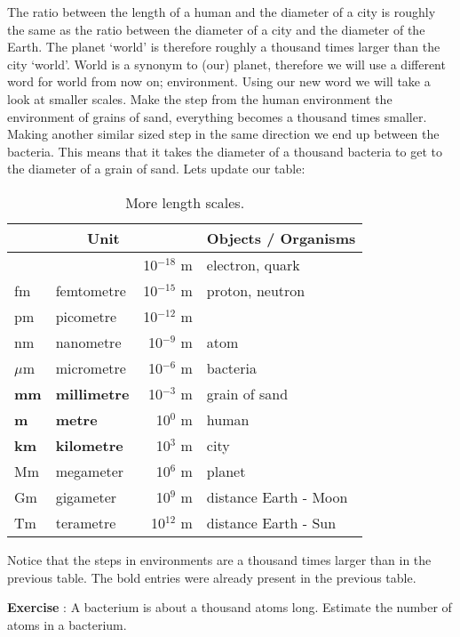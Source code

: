 The ratio between the length of a human and the diameter of a city is roughly the same as the ratio between the diameter of a city and the diameter of the Earth. The planet `world' is therefore roughly a thousand times larger than the city `world'. World is a synonym to (our) planet, therefore we will use a different word for world from now on; environment. Using our new word we will take a look at smaller scales. Make the step from the human environment the environment of grains of sand, everything becomes a thousand times smaller. Making another similar sized step in the same direction we end up between the bacteria. This means that it takes the diameter of a thousand bacteria to get to the diameter of a grain of sand. Lets update our table:
\begin{table}[h]\begin{centering}
\begin{tabular}{|l|l|r|l|}
\hline \multicolumn{3}{|c|}{Unit} & \multicolumn{1}{c|}{Objects / Organisms}  \\ \hline \hline
& & 10$^{-18}$ m & electron, quark  \\ \hline
fm & femtometre & 10$^{-15}$ m & proton, neutron  \\ \hline
pm & picometre & 10$^{-12}$ m &  \\ \hline
nm & nanometre & 10$^{-9}$ m & atom  \\ \hline
$\mu$m & micrometre & 10$^{-6}$ m & bacteria  \\ \hline
\textbf{mm} & \textbf{millimetre} & 10$^{-3}$ m & grain of sand  \\ \hline
\textbf{m} & \textbf{metre} & 10$^{0}$ m & human  \\ \hline
\textbf{km} & \textbf{kilometre} & 10$^{3}$ m & city  \\ \hline
Mm & megameter & 10$^{6}$ m & planet  \\ \hline
Gm & gigameter & 10$^{9}$ m & distance Earth - Moon  \\ \hline
Tm & terametre & 10$^{12}$ m & distance Earth - Sun  \\ \hline 
\end{tabular}
\caption{More length scales.}\label{tab:length_scales2}
\end{centering}\end{table}

Notice that the steps in environments are a thousand times larger than in the previous table. The bold entries were already present in the previous table.

\begin{shaded}
\textbf{Exercise \theExercise {}} : A bacterium is about a thousand atoms long. Estimate the number of atoms in a bacterium.\end{shaded}


